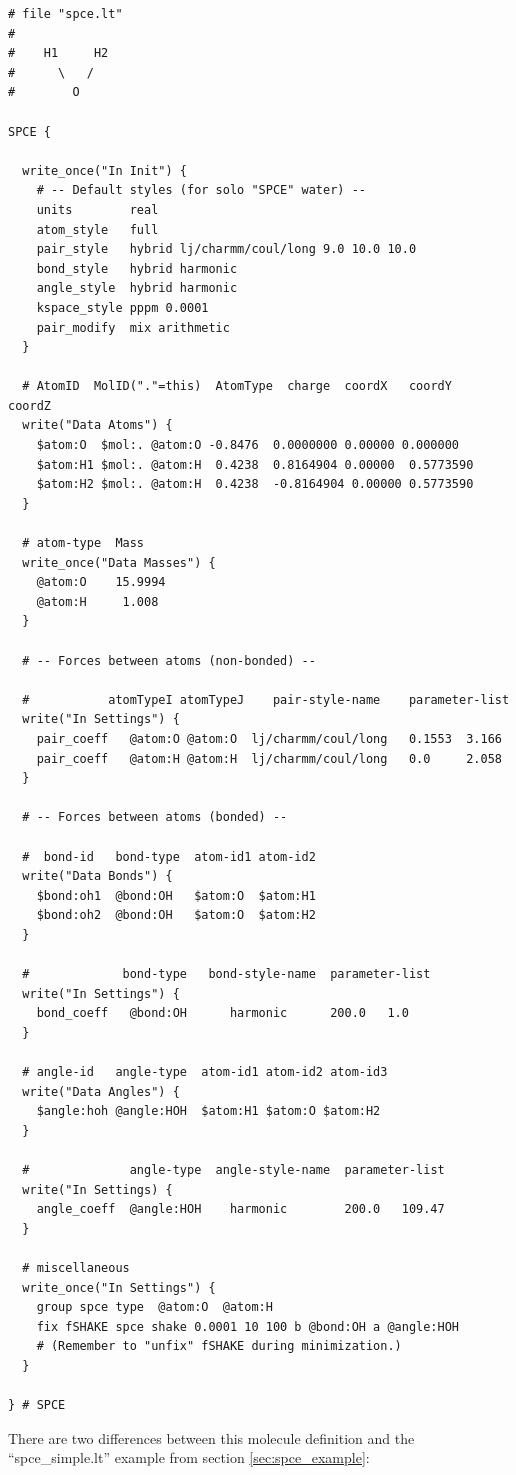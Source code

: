 \documentclass[11pt]{article}
\begin{document}
\begin{verbatim}
# file "spce.lt" 
#
#    H1     H2
#      \   /
#        O

SPCE {

  write_once("In Init") {
    # -- Default styles (for solo "SPCE" water) --
    units        real
    atom_style   full
    pair_style   hybrid lj/charmm/coul/long 9.0 10.0 10.0
    bond_style   hybrid harmonic
    angle_style  hybrid harmonic
    kspace_style pppm 0.0001
    pair_modify  mix arithmetic
  }

  # AtomID  MolID("."=this)  AtomType  charge  coordX   coordY   coordZ
  write("Data Atoms") {
    $atom:O  $mol:. @atom:O -0.8476  0.0000000 0.00000 0.000000
    $atom:H1 $mol:. @atom:H  0.4238  0.8164904 0.00000  0.5773590
    $atom:H2 $mol:. @atom:H  0.4238  -0.8164904 0.00000 0.5773590
  }

  # atom-type  Mass
  write_once("Data Masses") {
    @atom:O    15.9994
    @atom:H     1.008
  }

  # -- Forces between atoms (non-bonded) --

  #           atomTypeI atomTypeJ    pair-style-name    parameter-list
  write("In Settings") {
    pair_coeff   @atom:O @atom:O  lj/charmm/coul/long   0.1553  3.166 
    pair_coeff   @atom:H @atom:H  lj/charmm/coul/long   0.0     2.058
  }

  # -- Forces between atoms (bonded) --

  #  bond-id   bond-type  atom-id1 atom-id2
  write("Data Bonds") {
    $bond:oh1  @bond:OH   $atom:O  $atom:H1
    $bond:oh2  @bond:OH   $atom:O  $atom:H2
  }

  #             bond-type   bond-style-name  parameter-list
  write("In Settings") {
    bond_coeff   @bond:OH      harmonic      200.0   1.0 
  }

  # angle-id   angle-type  atom-id1 atom-id2 atom-id3
  write("Data Angles") {
    $angle:hoh @angle:HOH  $atom:H1 $atom:O $atom:H2
  }

  #              angle-type  angle-style-name  parameter-list
  write("In Settings) {
    angle_coeff  @angle:HOH    harmonic        200.0   109.47
  }

  # miscellaneous
  write_once("In Settings") {
    group spce type  @atom:O  @atom:H
    fix fSHAKE spce shake 0.0001 10 100 b @bond:OH a @angle:HOH
    # (Remember to "unfix" fSHAKE during minimization.)
  }

} # SPCE
\end{verbatim}
There are two differences between this molecule definition
and the ``spce\_simple.lt'' example from section
\ref{sec:spce_example}:
\end{document}
